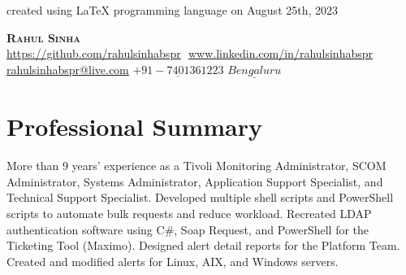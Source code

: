 \documentclass[letterpaper,10pt]{article}
\begin{document}
	
	\begin{flushright}
		\vspace{50 cm}
		\color{gray}
		\item
		created using LaTeX programming language on August 25th, 2023
	\end{flushright}
	
		
	\begin{center}
		\textbf{\Huge \scshape Rahul Sinha} \\ \vspace{8pt}
		\small
		\href{https://github.com/rahulsinhabspr}{\underline{https://github.com/rahulsinhabspr}} $  $
		\href{www.linkedin.com/in/rahulsinhabspr}{\underline{www.linkedin.com/in/rahulsinhabspr}} $  $
		\href{mailto:rahulsinhabspr@live.com}
		{\underline{rahulsinhabspr@live.com}}
		\newline
		{$\underline{+91-7401361223}$}
		{$\underline{Bengaluru}$}
	\end{center}
	
	\section{Professional Summary}
	More than 9 years' experience as a Tivoli Monitoring Administrator, SCOM Administrator, Systems Administrator, Application Support Specialist, and Technical Support Specialist. Developed multiple shell scripts and PowerShell scripts to automate bulk requests and reduce workload. Recreated LDAP authentication software using C\#, Soap Request, and PowerShell for the Ticketing Tool (Maximo). Designed alert detail reports for the Platform Team. Created and modified alerts for Linux, AIX, and Windows servers. \\
	
\end{document}
